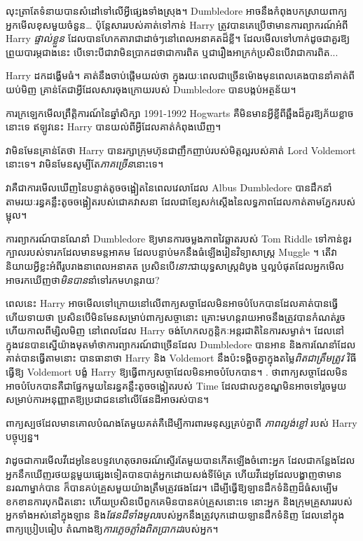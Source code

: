 លុះ​ត្រា​តែ​ទំនាយ​បាន​សំដៅ​ទៅ​លើ​អ្វី​ផ្សេង​ទាំង​ស្រុង។ Dumbledore អាច​នឹង​កំពុង​បកស្រាយ​ពាក្យ​អ្នក​មើល​ខុស​មួយ​ចំនួន… ប៉ុន្តែ​សារ​របស់​គាត់​ទៅ​កាន់ Harry ត្រូវ​បាន​គេ​ប្រើ​ថា​មាន​ការ​ព្យាករណ៍​អំពី Harry \emph{ផ្ទាល់ខ្លួន} ដែល​បាន​ហែក​តារា​ជា​ដាច់​ៗ​នៅ​ពេល​អនាគត​ដ៏​ខ្លី។ ដែលមើលទៅហាក់ដូចជាគួរឱ្យព្រួយបារម្ភជាងនេះ បើទោះបីជាវាមិនប្រាកដថាជាការពិត ឬជារឿងអាក្រក់ប្រសិនបើវាជាការពិត...

Harry ដកដង្ហើមធំ។ គាត់​នឹង​ចាប់​ផ្តើម​យល់​ថា ក្នុង​រយៈ​ពេល​ជា​ច្រើន​ម៉ោង​មុន​ពេល​គេង​បាន​នាំ​គាត់​ពី​យប់​មិញ គ្រាន់​តែ​ជា​អ្វី​ដែល​សារ​ចុង​ក្រោយ​របស់ Dumbledore បាន​បង្កប់​អត្ថន័យ។

ការក្រឡេកមើលព្រឹត្តិការណ៍នៃឆ្នាំសិក្សា 1991-1992 Hogwarts គឺមិនមានអ្វីខ្លីពីឆ្អឹងដ៏គួរឱ្យភ័យខ្លាចនោះទេ ឥឡូវនេះ Harry បានយល់ពីអ្វីដែលគាត់កំពុងឃើញ។

វាមិនមែនគ្រាន់តែថា Harry បានរក្សាក្រុមហ៊ុនជាញឹកញាប់របស់មិត្តល្អរបស់គាត់ Lord Voldemort នោះទេ។ វាមិនមែនសូម្បីតែ\emph{ភាគច្រើន}នោះទេ។

វាគឺជាការមើលឃើញនៃបន្ទាត់តូចចង្អៀតនៃពេលវេលាដែល Albus Dumbledore បានដឹកនាំតាមរយៈរន្ធគន្លឹះតូចចង្អៀតរបស់ជោគវាសនា ដែលជាខ្សែសក់ស្តើងនៃលទ្ធភាពដែលកាត់តាមភ្នែករបស់ម្ជុល។

ការព្យាករណ៍បានណែនាំ Dumbledore ឱ្យមានការចម្លងភាពវៃឆ្លាតរបស់ Tom Riddle ទៅកាន់ខួរក្បាលរបស់ទារកដែលមានមន្តអាគម ដែលបន្ទាប់មកនឹងធំឡើងរៀនវិទ្យាសាស្ត្រ Muggle ។ តើវានិយាយអ្វីខ្លះអំពីរូបរាងនាពេលអនាគត ប្រសិនបើ\emph{នោះ}ជាយុទ្ធសាស្ត្រដំបូង ឬល្អបំផុតដែលអ្នកមើលអាចរកឃើញថា\emph{មិនបាន}នាំទៅរកមហន្តរាយ?

ពេលនេះ Harry អាចមើលទៅក្រោយនៅលើពាក្យសច្ចាដែលមិនអាចបំបែកបានដែលគាត់បានធ្វើ ហើយទាយថា ប្រសិនបើមិនមែនសម្រាប់ពាក្យសច្ចានោះ គ្រោះមហន្តរាយអាចនឹងត្រូវបានកំណត់រួចហើយកាលពីម្សិលមិញ នៅពេលដែល Harry ចង់ហែកលក្ខន្តិកៈអន្តរជាតិនៃការសម្ងាត់។ ដែលនៅក្នុងវេនបានស្នើយ៉ាងមុតមាំថាការព្យាករណ៍ជាច្រើនដែល Dumbledore បានអាន និងការណែនាំដែលគាត់បានធ្វើតាមនោះ បានធានាថា Harry និង Voldemort នឹងប៉ះទង្គិចគ្នាក្នុងតម្លៃ\emph{ពិតជាត្រឹមត្រូវ} វិធីធ្វើឱ្យ Voldemort បង្ខំ Harry ឱ្យធ្វើពាក្យសច្ចាដែលមិនអាចបំបែកបាន។ . ថាពាក្យសច្ចាដែលមិនអាចបំបែកបានគឺជាផ្នែកមួយនៃរន្ធគន្លឹះតូចចង្អៀតរបស់ Time ដែលជាលក្ខខណ្ឌមិនអាចទៅរួចមួយសម្រាប់ការអនុញ្ញាតឱ្យប្រជាជននៅលើផែនដីអាចរស់បាន។

ពាក្យស្បថដែលមានគោលបំណងតែមួយគត់គឺដើម្បីការពារមនុស្សគ្រប់គ្នាពី \emph{ភាពល្ងង់ខ្លៅ} របស់ Harry បច្ចុប្បន្ន។

វាដូចជាការមើលវីដេអូនៃឧបទ្ទវហេតុចរាចរណ៍ស្ទើរតែមួយបានកើតឡើងចំពោះអ្នក ដែលជាកន្លែងដែលអ្នកនឹកឃើញរថយន្តមួយផ្សេងទៀតបានបាត់អ្នកដោយសង់ទីម៉ែត្រ ហើយវីដេអូដែលបង្ហាញថាមាននរណាម្នាក់បាន \emph{} ក៏បានគប់គ្រួសមួយយ៉ាងត្រឹមត្រូវផងដែរ។ ដើម្បីធ្វើឱ្យឡានដឹកទំនិញដ៏ធំសម្បើម ខកខានការបុកជិតនោះ ហើយប្រសិនបើពួកគេមិនបានគប់គ្រួសនោះទេ នោះអ្នក និងក្រុមគ្រួសាររបស់អ្នកទាំងអស់នៅក្នុងឡាន និង\emph{ផែនដីទាំងមូល}របស់អ្នកនឹងត្រូវបុកដោយឡានដឹកទំនិញ ដែលនៅក្នុង ពាក្យប្រៀបធៀប តំណាងឱ្យ\emph{ការភ្លេចភ្លាំងពិតប្រាកដ}របស់អ្នក។

